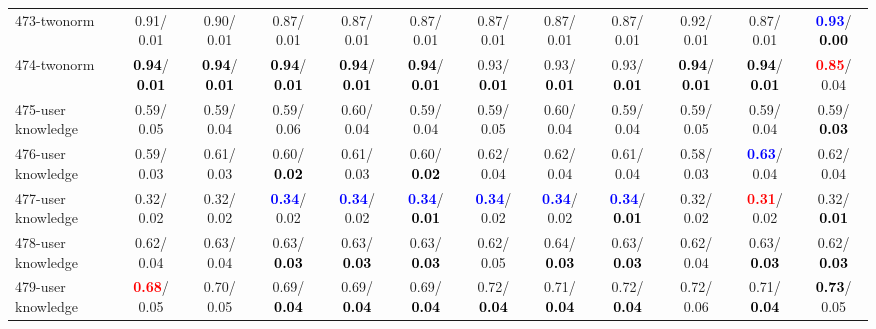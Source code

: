 \begin{table}[h]
\begin{center}
{\begin{tabular}{lc|c|c|c|c|c|c|c|c|c|c}
473-twonorm &   0.91/  0.01 &   0.90/  0.01 &   0.87/  0.01 &   0.87/  0.01 &   0.87/  0.01 &   0.87/  0.01 &   0.87/  0.01 &   0.87/  0.01 &   0.92/  0.01 &   0.87/  0.01 & \textcolor{blue}{\textbf{  0.93}}/\textcolor{black}{\textbf{  0.00}} \\
474-twonorm & \textcolor{black}{\textbf{  0.94}}/\textcolor{black}{\textbf{  0.01}} & \textcolor{black}{\textbf{  0.94}}/\textcolor{black}{\textbf{  0.01}} & \textcolor{black}{\textbf{  0.94}}/\textcolor{black}{\textbf{  0.01}} & \textcolor{black}{\textbf{  0.94}}/\textcolor{black}{\textbf{  0.01}} & \textcolor{black}{\textbf{  0.94}}/\textcolor{black}{\textbf{  0.01}} &   0.93/\textcolor{black}{\textbf{  0.01}} &   0.93/\textcolor{black}{\textbf{  0.01}} &   0.93/\textcolor{black}{\textbf{  0.01}} & \textcolor{black}{\textbf{  0.94}}/\textcolor{black}{\textbf{  0.01}} & \textcolor{black}{\textbf{  0.94}}/\textcolor{black}{\textbf{  0.01}} & \textcolor{red}{\textbf{  0.85}}/  0.04 \\
475-user knowledge &   0.59/  0.05 &   0.59/  0.04 &   0.59/  0.06 &   0.60/  0.04 &   0.59/  0.04 &   0.59/  0.05 &   0.60/  0.04 &   0.59/  0.04 &   0.59/  0.05 &   0.59/  0.04 &   0.59/\textcolor{black}{\textbf{  0.03}} \\
476-user knowledge &   0.59/  0.03 &   0.61/  0.03 &   0.60/\textcolor{black}{\textbf{  0.02}} &   0.61/  0.03 &   0.60/\textcolor{black}{\textbf{  0.02}} &   0.62/  0.04 &   0.62/  0.04 &   0.61/  0.04 &   0.58/  0.03 & \textcolor{blue}{\textbf{  0.63}}/  0.04 &   0.62/  0.04 \\ \hline
477-user knowledge &   0.32/  0.02 &   0.32/  0.02 & \textcolor{blue}{\textbf{  0.34}}/  0.02 & \textcolor{blue}{\textbf{  0.34}}/  0.02 & \textcolor{blue}{\textbf{  0.34}}/\textcolor{black}{\textbf{  0.01}} & \textcolor{blue}{\textbf{  0.34}}/  0.02 & \textcolor{blue}{\textbf{  0.34}}/  0.02 & \textcolor{blue}{\textbf{  0.34}}/\textcolor{black}{\textbf{  0.01}} &   0.32/  0.02 & \textcolor{red}{\textbf{  0.31}}/  0.02 &   0.32/\textcolor{black}{\textbf{  0.01}} \\
478-user knowledge &   0.62/  0.04 &   0.63/  0.04 &   0.63/\textcolor{black}{\textbf{  0.03}} &   0.63/\textcolor{black}{\textbf{  0.03}} &   0.63/\textcolor{black}{\textbf{  0.03}} &   0.62/  0.05 &   0.64/\textcolor{black}{\textbf{  0.03}} &   0.63/\textcolor{black}{\textbf{  0.03}} &   0.62/  0.04 &   0.63/\textcolor{black}{\textbf{  0.03}} &   0.62/\textcolor{black}{\textbf{  0.03}} \\
479-user knowledge & \textcolor{red}{\textbf{  0.68}}/  0.05 &   0.70/  0.05 &   0.69/\textcolor{black}{\textbf{  0.04}} &   0.69/\textcolor{black}{\textbf{  0.04}} &   0.69/\textcolor{black}{\textbf{  0.04}} &   0.72/\textcolor{black}{\textbf{  0.04}} &   0.71/\textcolor{black}{\textbf{  0.04}} &   0.72/\textcolor{black}{\textbf{  0.04}} &   0.72/  0.06 &   0.71/\textcolor{black}{\textbf{  0.04}} & \textcolor{black}{\textbf{  0.73}}/  0.05 \\

\end{tabular}}
\end{center}
\end{table}
